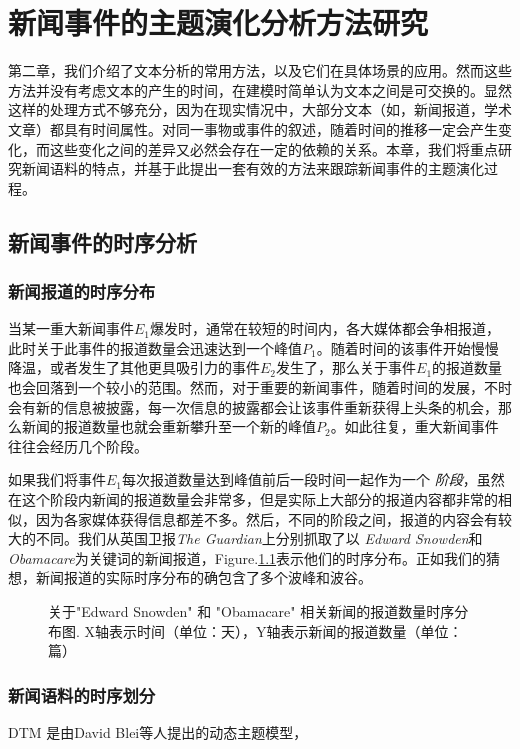 \chapter{新闻事件的主题演化分析方法研究}
第二章，我们介绍了文本分析的常用方法，以及它们在具体场景的应用。然而这些方法并没有考虑文本的产生的时间，在建模时简单认为文本之间是可交换的。显然这样的处理方式不够充分，因为在现实情况中，大部分文本（如，新闻报道，学术文章）都具有时间属性。对同一事物或事件的叙述，随着时间的推移一定会产生变化，而这些变化之间的差异又必然会存在一定的依赖的关系。本章，我们将重点研究新闻语料的特点，并基于此提出一套有效的方法来跟踪新闻事件的主题演化过程。

\section{新闻事件的时序分析}
\subsection{新闻报道的时序分布}
当某一重大新闻事件$E_1$爆发时，通常在较短的时间内，各大媒体都会争相报道，此时关于此事件的报道数量会迅速达到一个峰值$P_1$。随着时间的该事件开始慢慢降温，或者发生了其他更具吸引力的事件$E_2$发生了，那么关于事件$E_1$的报道数量也会回落到一个较小的范围。然而，对于重要的新闻事件，随着时间的发展，不时会有新的信息被披露，每一次信息的披露都会让该事件重新获得上头条的机会，那么新闻的报道数量也就会重新攀升至一个新的峰值$P_2$。如此往复，重大新闻事件往往会经历几个阶段。

如果我们将事件$E_1$每次报道数量达到峰值前后一段时间一起作为一个 \emph{阶段}，虽然在这个阶段内新闻的报道数量会非常多，但是实际上大部分的报道内容都非常的相似，因为各家媒体获得信息都差不多。然后，不同的阶段之间，报道的内容会有较大的不同。我们从英国卫报\emph{The Guardian}上分别抓取了以 \emph{Edward Snowden}和\emph{Obamacare}为关键词的新闻报道，Figure.\ref{temporal distribution}表示他们的时序分布。正如我们的猜想，新闻报道的实际时序分布的确包含了多个波峰和波谷。

\begin{figure}[htb]
	\caption{关于"Edward Snowden" 和 "Obamacare" 相关新闻的报道数量时序分布图. X轴表示时间（单位：天），Y轴表示新闻的报道数量（单位：篇）}
	\label{temporal distribution}
\end{figure}

\subsection{新闻语料的时序划分}
DTM \cite{Blei:2006}是由David Blei等人提出的动态主题模型，